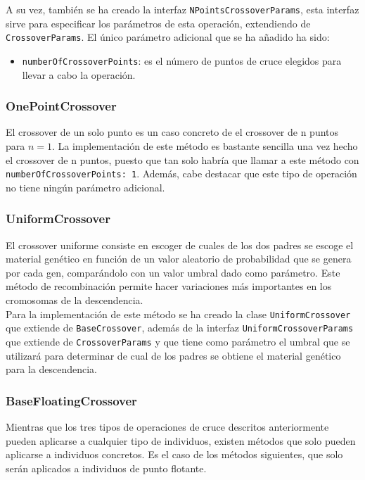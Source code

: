 A su vez, también se ha creado la interfaz \texttt{NPointsCrossoverParams}, esta interfaz sirve para especificar los parámetros de esta operación, extendiendo de \texttt{CrossoverParams}. El único parámetro adicional que se ha añadido ha sido:

\begin{itemize}
    \item \texttt{numberOfCrossoverPoints}: es el número de puntos de cruce elegidos para llevar a cabo la operación.
\end{itemize}

\subsubsection{OnePointCrossover}

El crossover de un solo punto es un caso concreto de el crossover de n puntos para $n = 1$. La implementación de este método es bastante sencilla una vez hecho el crossover de n puntos, puesto que tan solo habría que llamar a este método con \texttt{numberOfCrossoverPoints: 1}. Además, cabe destacar que este tipo de operación no tiene ningún parámetro adicional.

\subsubsection{UniformCrossover}

El crossover uniforme consiste en escoger de cuales de los dos padres se escoge el material genético en función de un valor aleatorio de probabilidad que se genera por cada gen, comparándolo con un valor umbral dado como parámetro. Este método de recombinación permite hacer variaciones más importantes en los cromosomas de la descendencia. \\

Para la implementación de este método se ha creado la clase \texttt{UniformCrossover} que extiende de \texttt{BaseCrossover}, además de la interfaz \texttt{UniformCrossoverParams} que extiende de \texttt{CrossoverParams} y que tiene como parámetro el umbral que se utilizará para determinar de cual de los padres se obtiene el material genético para la descendencia.

\subsubsection{BaseFloatingCrossover}

Mientras que los tres tipos de operaciones de cruce descritos anteriormente pueden aplicarse a cualquier tipo de individuos, existen métodos que solo pueden aplicarse a individuos concretos. Es el caso de los métodos siguientes, que solo serán aplicados a individuos de punto flotante. \\

